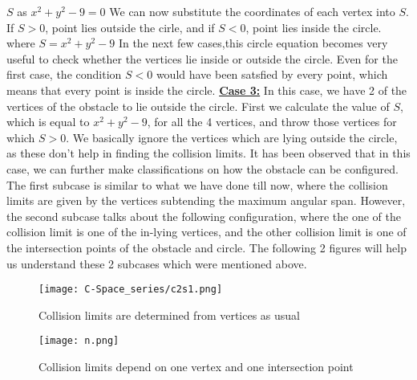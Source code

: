 \documentclass[12pt]{article}
\begin{document}
$S$ as $x^2 + y^2 - 9 = 0$
\newline
We can now substitute the coordinates of each vertex into $S$.
\newline
If $S>$0, point lies outside the cirle, and if $S<$0, point lies inside the circle.
\newline
where $S =x^2 + y^2 - 9 $
\newline
In the next few cases,this circle equation becomes very useful to check whether the vertices lie inside or outside the circle. Even for the first case, the condition $S<$0 would have been satsfied by every point, which means that every point is inside the circle.
\newline
\newline
\underline{\textbf{Case 3:}}
\newline
In this case, we have 2 of the vertices of the obstacle to lie outside the circle. First we calculate the value of $S$, which is equal to $x^2 + y^2 - 9$, for all the 4 vertices, and throw those vertices for which $S>$0. We basically ignore the vertices which are lying outside the circle, as these don't help in finding the collision limits.
\newline
\newline
It has been observed that in this case, we can further make classifications on how the obstacle can be configured. The first subcase is similar to what we have done till now, where the collision limits are given by the vertices subtending the maximum angular span. However, the second subcase talks about the following configuration, where the one of the collision limit is one of the in-lying vertices, and the other collision limit is one of the intersection points of the obstacle and circle.
\newline
\newline
The following 2 figures will help us understand these 2 subcases which were mentioned above.
\begin{figure}[h!]
    \centering
    \begin{minipage}{0.48\textwidth}
        \centering
        \texttt{[image: C-Space\_series/c2s1.png]}
        \caption{Collision limits are \newline
        determined from vertices as usual}
        \label{fig:c2s1}
    \end{minipage}
    \hfill
    \begin{minipage}{0.48\textwidth}
        \centering
        \texttt{[image: n.png]}
        \caption{Collision limits depend on one vertex and one intersection point}
        \label{fig:n}
    \end{minipage}
\end{figure}
\end{document}
